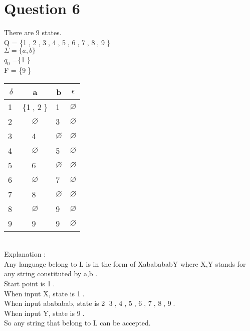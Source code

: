 \documentclass[a4paper]{article}
\begin{document}

\section{Question 6}
There are 9 states.\\
Q = \{\textcircled{1}, \textcircled{2}, \textcircled{3}, \textcircled{4}, \textcircled{5}, \textcircled{6}, \textcircled{7}, \textcircled{8}, \textcircled{9}\}\\
$\Sigma = \{a, b\}$\\
$q_{0}$ =\{\textcircled{1}\}\\
F = \{\textcircled{9}\}\\
\begin{tabular}{|c|c|c|c|}
\hline
$\delta$ & a & b & $\epsilon$  \\ 
\hline
\textcircled{1} &  \{\textcircled{1}, \textcircled{2}\} & \textcircled{1} & $\varnothing$ \\
\hline
\textcircled{2} & $\varnothing$ & \textcircled{3} & $\varnothing$ \\
\hline
\textcircled{3} & \textcircled{4} & $\varnothing$ & $\varnothing$ \\
\hline
\textcircled{4} & $\varnothing$ & \textcircled{5}  & $\varnothing$ \\
\hline
\textcircled{5} & \textcircled{6} & $\varnothing$   & $\varnothing$ \\
\hline
\textcircled{6} & $\varnothing$ & \textcircled{7}  & $\varnothing$ \\
\hline
\textcircled{7} & \textcircled{8} & $\varnothing$   & $\varnothing$ \\
\hline
\textcircled{8} & $\varnothing$ & \textcircled{9}  & $\varnothing$ \\
\hline
\textcircled{9} & \textcircled{9} & \textcircled{9}  & $\varnothing$ \\
\hline
\end{tabular}\\
Explanation :\\
Any language belong to L is in the form of XababababY where X,Y stands for any string constituted by {a,b} .\\
Start point is \textcircled{1}.\\
When input X, state is \textcircled{1}.\\
When input abababab, state is \textcircled{2} \textcircled{3}, \textcircled{4}, \textcircled{5}, \textcircled{6}, \textcircled{7}, \textcircled{8}, \textcircled{9}.\\
When input Y, state is \textcircled{9}.\\
So any string that belong to L can be accepted.
\end{document}
